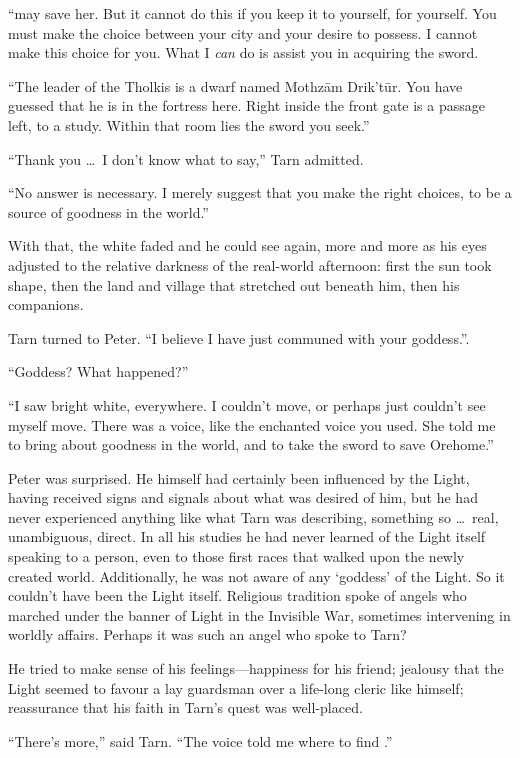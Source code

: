 ``\kildir may save her.  But it cannot do this if you keep it to yourself, for yourself.  You must make the choice between your city and your desire to possess.  I cannot make this choice for you.  What I \emph{can} do is assist you in acquiring the sword.

``The leader of the Tholkis is a dwarf named Mothz\=am Drik't\=ur. You have guessed that he is in the fortress here.  Right inside the front gate is a passage left, to a study.  Within that room lies the sword you seek.''

``Thank you \ldots\ I don't know what to say,'' Tarn admitted.

``No answer is necessary.  I merely suggest that you make the right choices, to be a source of goodness in the world.''

With that, the white faded and he could see again, more and more as his eyes adjusted to the relative darkness of the real-world afternoon: first the sun took shape, then the land and village that stretched out beneath him, then his companions.

Tarn turned to Peter. ``I believe I have just communed with your goddess.''.

``Goddess?  What happened?''

``I saw bright white, everywhere.  I couldn't move, or perhaps just couldn't see myself move. There was a voice, like the enchanted voice you used.  She told me to bring about goodness in the world, and to take the sword to save Orehome.''

Peter was surprised.  He himself had certainly been influenced by the Light, having received signs and signals about what was desired of him, but he had never experienced anything like what Tarn was describing, something so \ldots\ real, unambiguous, direct.  In all his studies he had never learned of the Light itself speaking to a person, even to those first races that walked upon the newly created world.  Additionally, he was not aware of any `goddess' of the Light.  So it couldn't have been the Light itself.  Religious tradition spoke of angels who marched under the banner of Light in the Invisible War, sometimes intervening in worldly affairs.  Perhaps it was such an angel who spoke to Tarn?

He tried to make sense of his feelings---happiness for his friend; jealousy that the Light seemed to favour a lay guardsman over a life-long cleric like himself; reassurance that his faith in Tarn's quest was well-placed.

``There's more,'' said Tarn.  ``The voice told me where to find \kildir.''

